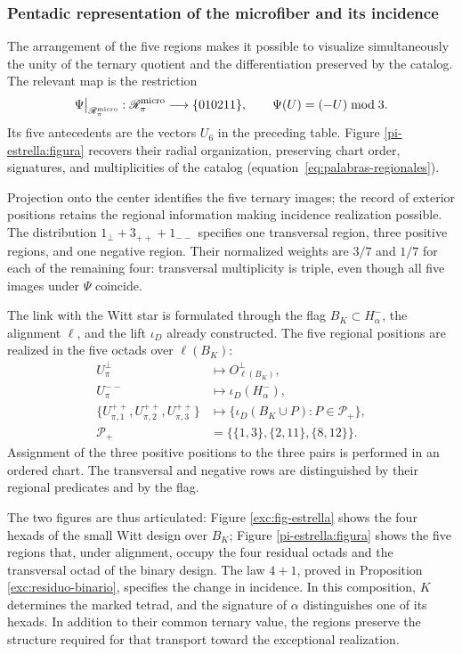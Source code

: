 \subsubsection{Pentadic representation of the microfiber and its incidence}
\label{pi-estrella:desarrollo}

The arrangement of the five regions makes it possible to visualize simultaneously
the unity of the ternary quotient and the differentiation preserved by the
catalog. The relevant map is the restriction
\[
 \Psi\big|_{\mathscr R_\pi^{\rm micro}}:
 \mathscr R_\pi^{\rm micro}\longrightarrow\{010211\},
 \qquad \Psi(U)=(-U)\bmod3.
\]
Its five antecedents are the vectors \(U_6\) in the preceding table.
Figure \ref{pi-estrella:figura} recovers their radial organization,
preserving chart order, signatures, and multiplicities of the
catalog (equation~\eqref{eq:palabras-regionales}).



Projection onto the center identifies the five ternary images; the
record of exterior positions retains the regional information
making incidence realization possible. The distribution
\(1_\perp+3_{++}+1_{--}\) specifies one transversal region, three
positive regions, and one negative region. Their normalized weights are
\(3/7\) and \(1/7\) for each of the remaining four: transversal
multiplicity is triple, even though all five images under
\(\Psi\) coincide.

The link with the Witt star is formulated through the flag
\(B_K\subset H^-_\alpha\), the alignment \(\ell\), and the
lift \(\iota_D\) already constructed. The five regional positions
are realized in the five octads over \(\ell(B_K)\):
\[
\begin{aligned}
 U_\pi^\perp&\longmapsto O^\perp_{\ell(B_K)},\\
 U_\pi^{--}&\longmapsto\iota_D(H^-_\alpha),\\
 \{U_{\pi,1}^{++},U_{\pi,2}^{++},U_{\pi,3}^{++}\}
 &\longmapsto
 \{\iota_D(B_K\cup P):P\in\mathcal P_+\},\\
 \mathcal P_+&=\bigl\{\{1,3\},\{2,11\},\{8,12\}\bigr\}.
\end{aligned}
\]
Assignment of the three positive positions to the three pairs is
performed in an ordered chart. The transversal and negative rows
are distinguished by their regional predicates and by the flag.

The two figures are thus articulated: Figure
\ref{exc:fig-estrella} shows the four hexads of the small Witt
design over \(B_K\); Figure \ref{pi-estrella:figura} shows
the five regions that, under alignment, occupy the four residual
octads and the transversal octad of the binary design. The law
\(4+1\), proved in Proposition
\ref{exc:residuo-binario}, specifies the change in incidence. In this
composition, \(K\) determines the marked tetrad, and the signature of
\(\alpha\) distinguishes one of its hexads. In addition to their common
ternary value, the regions preserve the structure required for that
transport toward the exceptional realization.
